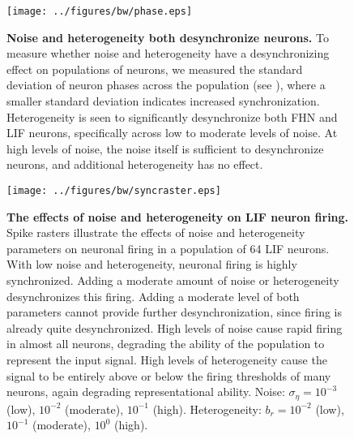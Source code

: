 \documentclass[12pt]{article}
\begin{document}
\begin{figure}
  \ifx\hidefigures\undefined
    \centering
    \texttt{[image: ../figures/bw/phase.eps]}
  \fi
  \caption{
    \textbf{Noise and heterogeneity both desynchronize neurons.} To measure whether noise and heterogeneity have a desynchronizing effect on populations of neurons, we measured the standard deviation of neuron phases across the population (see \textsc{}), where a smaller standard deviation indicates increased synchronization. Heterogeneity is seen to significantly desynchronize both FHN and LIF neurons, specifically across low to moderate levels of noise. At high levels of noise, the noise itself is sufficient to desynchronize neurons, and additional heterogeneity has no effect.
  }
  \label{fig:phase}
\end{figure}

\begin{figure}
  \ifx\hidefigures\undefined
    \centering
    \texttt{[image: ../figures/bw/syncraster.eps]}
  \fi
  \caption{
    \textbf{The effects of noise and heterogeneity on LIF neuron firing.}
    Spike rasters illustrate the effects of noise and heterogeneity parameters on neuronal firing in a population of 64 LIF neurons. With low noise and heterogeneity, neuronal firing is highly synchronized. Adding a moderate amount of noise or heterogeneity desynchronizes this firing. Adding a moderate level of both parameters cannot provide further desynchronization, since firing is already quite desynchronized. High levels of noise cause rapid firing in almost all neurons, degrading the ability of the population to represent the input signal. High levels of heterogeneity cause the signal to be entirely above or below the firing thresholds of many neurons, again degrading representational ability. Noise: $\sigma_\eta = $$10^{-3}$ (low), $10^{-2}$ (moderate), $10^{-1}$ (high). Heterogeneity: $b_r = $$10^{-2}$ (low), $10^{-1}$ (moderate), $10^{0}$ (high).
  }
  \label{fig:syncraster}
\end{figure}
\end{document}
